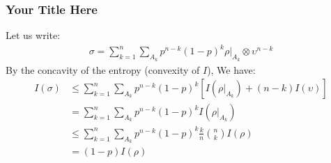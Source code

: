 \documentclass{beamer}
\begin{document}
\begin{frame}
  \frametitle{Your Title Here}
Let us write: 
\begin{equation*}
  \begin{split}
    \sigma = \sum^{n}_{k=1}\sum_{A_{k}}p^{n-k}\left( 1 - p  \right)^{k}\rho|_{A_{k}}\otimes \upsilon^{n-k}
  \end{split}
\end{equation*}
By the concavity of the entropy (convexity of $I$), We have:
\begin{equation*}
  \begin{split}
    I\left(\sigma\right) &\le \sum^{n}_{k=1}\sum_{A_{k}}p^{n-k}\left( 1 - p  \right)^{k}\left[ I\left(\rho|_{A_{k}}\right) + (n-k) I(\upsilon) \right] \\ 
    &= \sum^{n}_{k=1}\sum_{A_{k}}p^{n-k}\left( 1 - p  \right)^{k} I\left(\rho|_{A_{k}}\right)  \\ 
    & \le \sum^{n}_{k=1}\sum_{A_{k}}p^{n-k}\left( 1 - p  \right)^{k} \frac{k}{n} { n \choose k } I\left(\rho\right)  \\ 
    & = \left( 1 - p \right)I\left(\rho\right)
  \end{split}
\end{equation*}
\end{frame}
\end{document}
